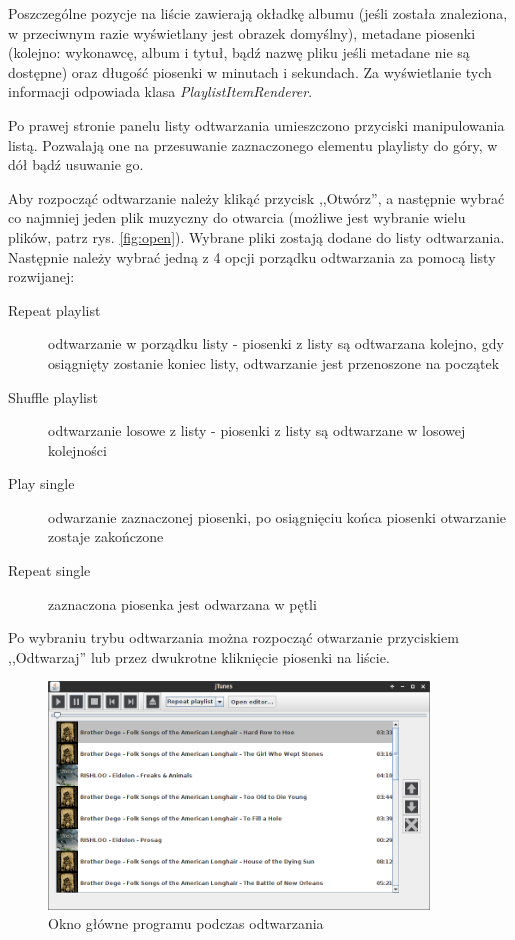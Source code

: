 \documentclass[12pt,a4paper,notitlepage]{article}
\begin{document}
Poszczególne pozycje na liście zawierają okładkę albumu (jeśli została znaleziona, w przeciwnym razie wyświetlany jest obrazek domyślny), metadane piosenki (kolejno: wykonawcę, 
album i tytuł, bądź nazwę pliku jeśli metadane nie są dostępne) oraz długość piosenki w minutach i sekundach. Za wyświetlanie tych informacji odpowiada klasa \emph{PlaylistItemRenderer}.

Po prawej stronie panelu listy odtwarzania umieszczono przyciski manipulowania listą. Pozwalają one na przesuwanie zaznaczonego elementu playlisty do góry, w dół bądź usuwanie go.

Aby rozpocząć odtwarzanie należy klikąć przycisk ,,Otwórz'', a następnie wybrać co najmniej jeden plik muzyczny do otwarcia (możliwe jest wybranie wielu plików, patrz rys. \ref{fig:open}).
Wybrane pliki zostają dodane do listy odtwarzania. Następnie należy wybrać jedną z 4 opcji porządku odtwarzania za pomocą listy rozwijanej:
\begin{description}
 \item[Repeat playlist] odtwarzanie w porządku listy - piosenki z listy są odtwarzana kolejno, gdy osiągnięty zostanie koniec listy, odtwarzanie jest przenoszone na początek
 \item[Shuffle playlist] odtwarzanie losowe z listy - piosenki z listy są odtwarzane w losowej kolejności
 \item[Play single] odwarzanie zaznaczonej piosenki, po osiągnięciu końca piosenki otwarzanie zostaje zakończone
 \item[Repeat single] zaznaczona piosenka jest odwarzana w pętli
\end{description}
Po wybraniu trybu odtwarzania można rozpocząć otwarzanie przyciskiem ,,Odtwarzaj'' lub przez dwukrotne kliknięcie piosenki na liście.

\begin{figure}[H]
 \centering
 \includegraphics[width=0.9\textwidth]{img/player_playing.png}
 \caption{Okno główne programu podczas odtwarzania}
 \label{fig:player_playing}
\end{figure}
\end{document}

